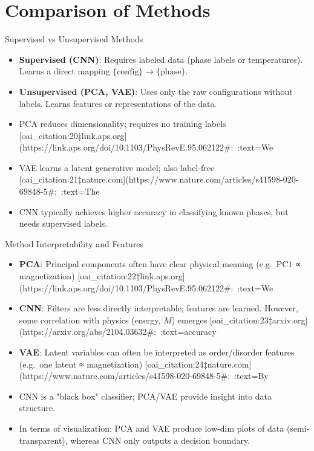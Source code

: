 \documentclass{beamer}
\begin{document}
\section{Comparison of Methods}

\begin{frame}{Supervised vs Unsupervised Methods}
 \begin{itemize}
   \item \textbf{Supervised (CNN)}: Requires labeled data (phase labels or temperatures). Learns a direct mapping $\{\text{config}\}\to\{\text{phase}\}$.
   \item \textbf{Unsupervised (PCA, VAE)}: Uses only the raw configurations without labels. Learns features or representations of the data.
   \item PCA reduces dimensionality; requires no training labels [oai_citation:20‡link.aps.org](https://link.aps.org/doi/10.1103/PhysRevE.95.062122#:~:text=We%
   \item VAE learns a latent generative model; also label-free [oai_citation:21‡nature.com](https://www.nature.com/articles/s41598-020-69848-5#:~:text=The%
   \item CNN typically achieves higher accuracy in classifying known phases, but needs supervised labels.
 \end{itemize}
\end{frame}

\begin{frame}{Method Interpretability and Features}
 \begin{itemize}
   \item \textbf{PCA}: Principal components often have clear physical meaning (e.g.\ PC1 ∝ magnetization) [oai_citation:22‡link.aps.org](https://link.aps.org/doi/10.1103/PhysRevE.95.062122#:~:text=We%
   \item \textbf{CNN}: Filters are less directly interpretable; features are learned. However, some correlation with physics (energy, $M$) emerges [oai_citation:23‡arxiv.org](https://arxiv.org/abs/2104.03632#:~:text=accuracy%
   \item \textbf{VAE}: Latent variables can often be interpreted as order/disorder features (e.g.\ one latent ≈ magnetization) [oai_citation:24‡nature.com](https://www.nature.com/articles/s41598-020-69848-5#:~:text=By%
   \item CNN is a "black box" classifier; PCA/VAE provide insight into data structure.
   \item In terms of visualization: PCA and VAE produce low-dim plots of data (semi-transparent), whereas CNN only outputs a decision boundary.
 \end{itemize}
\end{frame}
\end{document}

